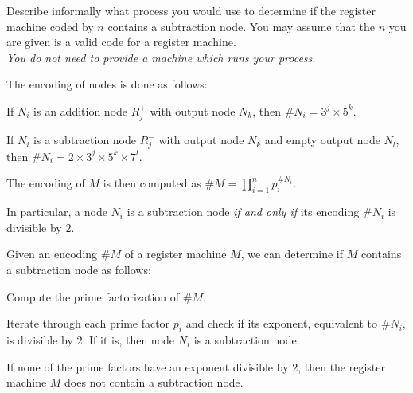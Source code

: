 \begin{problem}
  Describe informally what process you would use to determine
  if the register machine coded by $n$ contains a subtraction node.
  You may assume that the $n$ you are given is a valid code
  for a register machine. \\
  \emph{You do not need to provide a machine which runs your process.}

  \begin{answer}
    The encoding of nodes is done as follows:
    \begin{enumroman}
      \item If $N_i$ is an addition node $R_j^+$ with output node $N_k$,
        then $\#N_i = 3^j \times 5^k$.
      \item If $N_i$ is a subtraction node $R_j^-$ with output node $N_k$
        and empty output node $N_l$, then $\#N_i = 2 \times 3^j \times 5^k \times 7^l$.
      \item The encoding of $M$ is then computed as $\displaystyle \#M = \prod_{i=1}^n p_i^{\#N_i}$.
    \end{enumroman}

    In particular, a node $N_i$ is a subtraction node \emph{if and only if}
    its encoding $\#N_i$ is divisible by $2$.

    Given an encoding $\#M$ of a register machine $M$,
    we can determine if $M$ contains a subtraction node as follows:
    
    \begin{enumarabic}
      \item Compute the prime factorization of $\#M$.
      \item Iterate through each prime factor $p_i$ and check if its exponent,
        equivalent to $\#N_i$, is divisible by $2$.
        If it is, then node $N_i$ is a subtraction node.
      \item If none of the prime factors have an exponent divisible by $2$,
        then the register machine $M$ does not contain a subtraction node.
    \end{enumarabic}
    
  \end{answer}
\end{problem}
